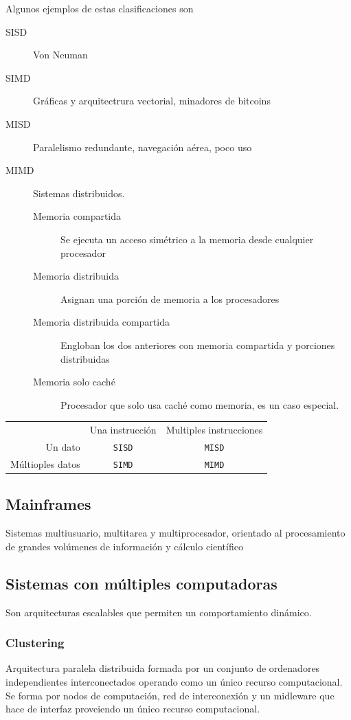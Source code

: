 Algunos ejemplos de estas clasificaciones son
\begin{description}
    \item[SISD] Von Neuman
    \item[SIMD] Gráficas y arquitectrura vectorial, minadores de bitcoins
    \item[MISD] Paralelismo redundante, navegación aérea, poco uso
    \item[MIMD] Sistemas distribuidos.
    \begin{description}
        \item[Memoria compartida] Se ejecuta un acceso simétrico a la memoria desde cualquier procesador
        \item[Memoria distribuida] Asignan una porción de memoria a los procesadores
        \item[Memoria distribuida compartida] Engloban los dos anteriores con memoria compartida y porciones distribuidas
        \item[Memoria solo caché] Procesador que solo usa caché como memoria, es un caso especial.
    \end{description}
\end{description}
\begin{table}[H]
\begin{tabular}{rcc}
                        & Una instrucción & Multiples instrucciones \\
    Un dato             & \texttt{SISD} & \texttt{MISD} \\
    Múltioples datos    & \texttt{SIMD} & \texttt{MIMD} \\
\end{tabular}
\end{table}

\subsection{Mainframes}
Sistemas multiusuario, multitarea y multiprocesador, orientado al procesamiento de grandes volúmenes de información y cálculo científico

\subsection{Sistemas con múltiples computadoras}
Son arquitecturas escalables que permiten un comportamiento dinámico.

\subsubsection{Clustering}
Arquitectura paralela distribuida formada por un conjunto de ordenadores independientes interconectados operando como un único recurso computacional. Se forma por nodos de computación, red de interconexión y un midleware que hace de interfaz proveiendo un único recurso computacional.

